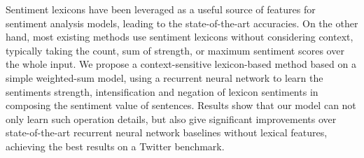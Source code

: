 Sentiment lexicons have been leveraged as a useful source of features for sentiment analysis models, leading to the state-of-the-art accuracies. On the other hand, most existing methods use sentiment lexicons without considering context, typically taking the count, sum of strength, or maximum sentiment scores over the whole input. We propose a context-sensitive lexicon-based method based on a simple weighted-sum model, using a recurrent neural network to learn the sentiments strength, intensification and negation of lexicon sentiments in composing the sentiment value of sentences. Results show that our model can not only learn such operation details, but also give significant improvements over state-of-the-art recurrent neural network baselines without lexical features, achieving the best results on a Twitter benchmark.
